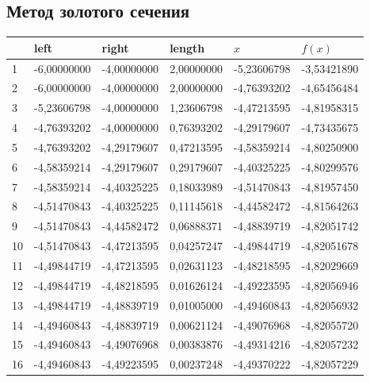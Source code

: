 \subsection{Метод золотого сечения}\label{subsec:метод-золотого-сечения}
\begin{center}
    \begin{tabular}{ | l | l | l | l | l | l |}
        \hline
        \textnumero{} & left        & right       & length     & $x$         & $f(x)$      \\ \hline
        1             & -6,00000000 & -4,00000000 & 2,00000000 & -5,23606798 & -3,53421890 \\
        2             & -6,00000000 & -4,00000000 & 2,00000000 & -4,76393202 & -4,65456484 \\
        3             & -5,23606798 & -4,00000000 & 1,23606798 & -4,47213595 & -4,81958315 \\
        4             & -4,76393202 & -4,00000000 & 0,76393202 & -4,29179607 & -4,73435675 \\
        5             & -4,76393202 & -4,29179607 & 0,47213595 & -4,58359214 & -4,80250900 \\
        6             & -4,58359214 & -4,29179607 & 0,29179607 & -4,40325225 & -4,80299576 \\
        7             & -4,58359214 & -4,40325225 & 0,18033989 & -4,51470843 & -4,81957450 \\
        8             & -4,51470843 & -4,40325225 & 0,11145618 & -4,44582472 & -4,81564263 \\
        9             & -4,51470843 & -4,44582472 & 0,06888371 & -4,48839719 & -4,82051742 \\
        10            & -4,51470843 & -4,47213595 & 0,04257247 & -4,49844719 & -4,82051678 \\
        11            & -4,49844719 & -4,47213595 & 0,02631123 & -4,48218595 & -4,82029669 \\
        12            & -4,49844719 & -4,48218595 & 0,01626124 & -4,49223595 & -4,82056946 \\
        13            & -4,49844719 & -4,48839719 & 0,01005000 & -4,49460843 & -4,82056932 \\
        14            & -4,49460843 & -4,48839719 & 0,00621124 & -4,49076968 & -4,82055720 \\
        15            & -4,49460843 & -4,49076968 & 0,00383876 & -4,49314216 & -4,82057232 \\
        16            & -4,49460843 & -4,49223595 & 0,00237248 & -4,49370222 & -4,82057229 \\

\end{tabular}
\end{center}
